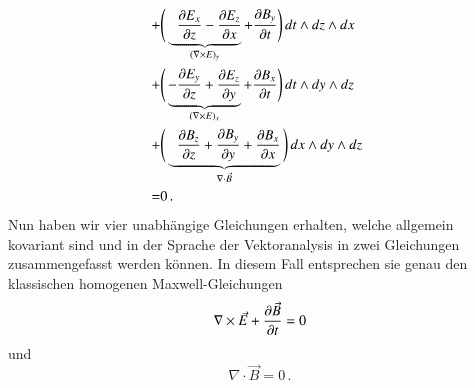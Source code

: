 \begin{align*}
	\\
	+&\Bigg( \underbrace{ \phantom{+} \frac{\d E_x}{\d z} - \frac{\d E_z}{\d x}}_{(\nabla \times E)_y} + \frac{\d B_y}{\d t} \Bigg) \, dt \wedge dz \wedge dx
	\\
	+&\Bigg( \underbrace{ - \frac{\d E_y}{\d z} + \frac{\d E_z}{\d y}}_{(\nabla \times E)_x} + \frac{\d B_x}{\d t} \Bigg) \, dt \wedge dy \wedge dz
	\\
	+&\Bigg( \underbrace{ \phantom{+} \frac{\d B_z}{\d z} + \frac{\d B_y}{\d y} + \frac{\d B_x}{\d x}}_{\nabla \cdot \vec{B}} \Bigg) \, dx \wedge dy \wedge dz  \, \,
	\\
	\phantom{=} =&0 \, .
\end{align*}
Nun haben wir vier unabhängige Gleichungen erhalten, welche allgemein kovariant sind und in der Sprache der Vektoranalysis in zwei Gleichungen zusammengefasst werden können. 
In diesem Fall entsprechen sie genau den klassischen homogenen Maxwell-Gleichungen
\[
\nabla \times \vec{E} + \frac{\d \vec{B}}{\d t} = 0
\]
und
\[
\nabla \cdot \vec{B} = 0 \, .
\]

